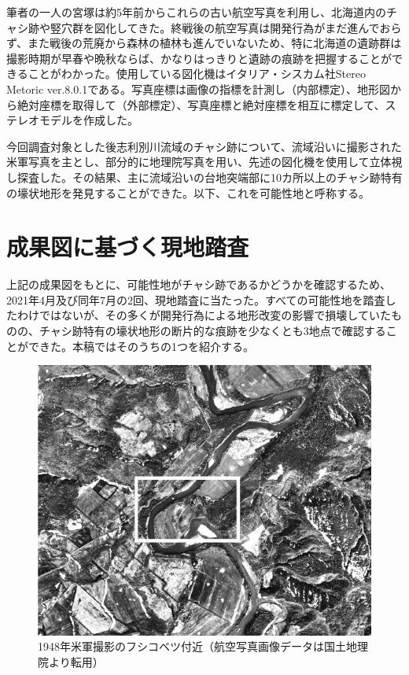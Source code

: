 \documentclass[a4j,11pt,twocolumn,openany]{jsbook}
\begin{document}
筆者の一人の宮塚は約5年前からこれらの古い航空写真を利用し、北海道内のチャシ跡や竪穴群を図化してきた。終戦後の航空写真は開発行為がまだ進んでおらず、また戦後の荒廃から森林の植林も進んでいないため、特に北海道の遺跡群は撮影時期が早春や晩秋ならば、かなりはっきりと遺跡の痕跡を把握することができることがわかった。使用している図化機はイタリア・シスカム社Stereo Metoric ver.8.0.1である。写真座標は画像の指標を計測し（内部標定）、地形図から絶対座標を取得して（外部標定）、写真座標と絶対座標を相互に標定して、ステレオモデルを作成した。

今回調査対象とした後志利別川流域のチャシ跡について、流域沿いに撮影された米軍写真を主とし、部分的に地理院写真を用い、先述の図化機を使用して立体視し探査した。その結果、主に流域沿いの台地突端部に10カ所以上のチャシ跡特有の壕状地形を発見することができた。以下、これを可能性地と呼称する。

\section{成果図に基づく現地踏査}
上記の成果図をもとに、可能性地がチャシ跡であるかどうかを確認するため、2021年4月及び同年7月の2回、現地踏査に当たった。すべての可能性地を踏査したわけではないが、その多くが開発行為による地形改変の影響で損壊していたものの、チャシ跡特有の壕状地形の断片的な痕跡を少なくとも3地点で確認することができた。本稿ではそのうちの1つを紹介する。

\begin{figure}[ht]
	\centering
	\includegraphics[width=\linewidth]{fig/05_Miyamoto/pic01.pdf}
	\caption{
		1948年米軍撮影のフシコベツ付近（航空写真画像データは国土地理院より転用）}
	\label{miya01pic}
\end{figure}
\end{document}
